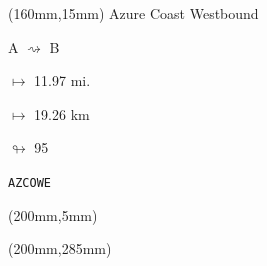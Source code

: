 \begin{textblock*}{40mm}(160mm,15mm)%
Azure Coast Westbound
\par A $\rightsquigarrow$ B
\Large
\par$\mapsto$ 11.97 mi.
\par$\mapsto$ 19.26 km
\par$\looparrowright$ 95
\par\hfill\tiny\tt AZCOWE\\
\end{textblock*}
\begin{textblock*}{20mm}(200mm,5mm)%
\fbox{\thepage}
\end{textblock*}
\begin{textblock*}{20mm}(200mm,285mm)%
\fbox{\thepage}
\end{textblock*}
\null\newpage


